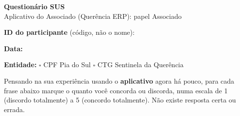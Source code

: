 \documentclass[11pt,a4paper]{article}
\begin{document}
\begin{center}
  {\LARGE\bfseries\color{brandgreen} Questionário SUS}\\[1mm]
  {\large Aplicativo do Associado (Querência ERP): papel Associado}
\end{center}

\vspace{3mm}
\noindent\textbf{ID do participante} (código, não o nome): \makebox[4cm]{\hrulefill}

\vspace{2mm}
\noindent\textbf{Data:} \makebox[3.5cm]{\hrulefill}

\vspace{2mm}
\noindent\textbf{Entidade:} $\square$ CPF Pia do Sul \hspace{8mm} $\square$ CTG Sentinela da Querência

\vspace{4mm}
\noindent\colorbox{lightbg}{%
  \begin{minipage}{0.95\linewidth}
  \vspace{1mm}
  Pensando na sua experiência usando o \textbf{aplicativo} agora há pouco, para cada frase abaixo
  marque o quanto você concorda ou discorda, numa escala de 1 (discordo totalmente) a 5 (concordo
  totalmente). Não existe resposta certa ou errada.
  \vspace{1mm}
  \end{minipage}%
}
\end{document}
